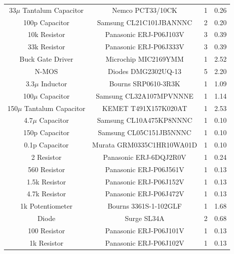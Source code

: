 \documentclass[12pt]{article}
\begin{document}
\begin{table}[!h]
{\begin{tabular}{ |c|c|c|c| }
 		33$\mu$ Tantalum Capacitor & Nemco PCT33/10CK & 1 & 0.26 \\
 		100p Capacitor & Samsung CL21C101JBANNNC & 2 & 0.20 \\
 		10k Resistor & Panasonic ERJ-P06J103V & 3 & 0.39 \\
 		33k Resistor & Panasonic ERJ-P06J333V & 3 & 0.39 \\
 		Buck Gate Driver & Microchip MIC2169YMM & 1 & 2.52 \\
 		N-MOS & Diodes DMG2302UQ-13 & 5 & 2.20 \\
 		3.3$\mu$ Inductor & Bourns SRP0610-3R3K & 1 & 1.09 \\
 		100$\mu$ Capacitor & Samsung CL32A107MPVNNNE & 1 & 1.14 \\
 		150$\mu$ Tantalum Capacitor & KEMET T491X157K020AT & 1 & 2.53 \\
 		4.7$\mu$ Capacitor & Samsung CL10A475KP8NNNC & 1 & 0.10 \\
 		150p Capacitor & Samsung CL05C151JB5NNNC & 1 & 0.10 \\
 		0.1p Capacitor & Murata GRM0335C1HR10WA01D & 1 & 0.10 \\
 		2 Resistor & Panasonic ERJ-6DQJ2R0V & 1 & 0.24 \\
 		560 Resistor & Panasonic ERJ-P06J561V & 1 & 0.13 \\
 		1.5k Resistor & Panasonic ERJ-P06J152V & 1 & 0.13 \\
 		4.7k Resistor & Panasonic ERJ-P06J472V & 1 & 0.13 \\
 		1k Potentiometer & Bourns 3361S-1-102GLF & 1 & 1.68 \\
 		Diode & Surge SL34A & 2 & 0.68 \\
 		100 Resistor & Panasonic ERJ-P06J101V & 1 & 0.13 \\
 		1k Resistor & Panasonic ERJ-P06J102V & 1 & 0.13 \\
 		\hline
	\end{tabular}
	}
\end{table}
\end{document}
